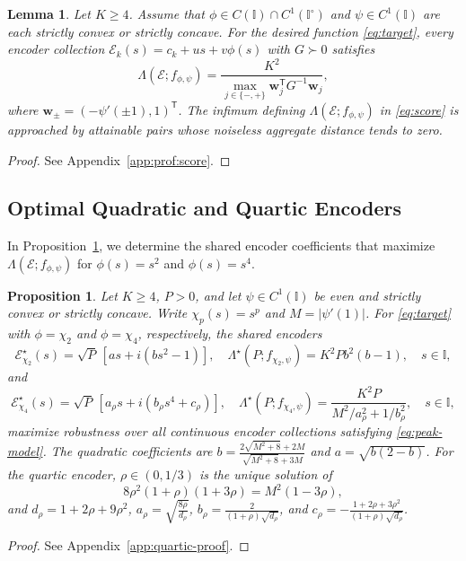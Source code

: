 \documentclass[journal,12pt,onecolumn,draftclsnofoot]{IEEEtran}
\newtheorem{lemma}{Lemma}
\newtheorem{proposition}{Proposition}
\newcommand{\enc}{\mathscr{E}}\newcommand{\dec}{\mathscr{D}}\newcommand{\R}{\mathbb R}\newcommand{\C}{\mathbb C}
\newcommand{\T}{\mathsf T}\newcommand{\suc}{\succeq}
\begin{document}
\begin{lemma}\label{prop:score}
Let $K\ge4$. Assume that
$\phi\in C(\mathbb I)\cap C^1(\mathbb I^\circ)$ and
$\psi\in C^1(\mathbb I)$ are each strictly convex or strictly
concave. For the desired function \eqref{eq:target}, every
encoder collection $\enc_k(s)=c_k+us+v\phi(s)$ with $G\succ0$
satisfies
\begin{equation}
 \Lambda(\enc;f_{\phi,\psi})
 =\frac{K^2}{\max_{j\in\{-,+\}}\boldsymbol w_j^\T G^{-1}\boldsymbol w_j},
 \label{eq:exactscore}
\end{equation}
where $\boldsymbol w_\pm=(-\psi'(\pm1),1)^\T$.
The infimum defining $\Lambda(\enc;f_{\phi,\psi})$ in \eqref{eq:score} is approached by attainable pairs whose
noiseless aggregate distance tends to zero.
\end{lemma}
\begin{proof}
    See Appendix~\ref{app:prof:score}. 
\end{proof}



\subsection{Optimal Quadratic and Quartic Encoders}\label{sec:quadratic-quartic}

In Proposition~\ref{thm:parabola}, we determine the shared encoder
coefficients that maximize $\Lambda(\enc;f_{\phi,\psi})$ for
$\phi(s)=s^2$ and $\phi(s)=s^4$.

\begin{proposition}
\label{thm:parabola}
Let $K\ge4$, $P>0$, and let $\psi\in C^1(\mathbb I)$ be even
and strictly convex or strictly concave. Write $\chi_p(s)=s^p$
and $M=|\psi'(1)|$. For \eqref{eq:target} with
$\phi=\chi_2$ and $\phi=\chi_4$, respectively, the shared encoders
\begin{equation}
 \enc_{\chi_2}^\star(s)=\sqrt P\,[a s+i(bs^2-1)], \quad 
\Lambda^\star(P;f_{\chi_2,\psi})=K^2P b^2(b-1),\quad s\in\mathbb I,
 \label{eq:parabola}
\end{equation}
and
\begin{equation}
 \enc_{\chi_4}^\star(s)=\sqrt P\,[a_\rho s+i(b_\rho s^4+c_\rho)],\quad
\Lambda^\star(P;f_{\chi_4,\psi})=\frac{K^2P}{M^2/a_\rho^2+1/b_\rho^2},\quad s\in\mathbb I,
 \label{eq:quarticscore}
\end{equation}
maximize robustness over all continuous encoder collections
satisfying \eqref{eq:peak-model}. The quadratic coefficients are $b=\frac{2\sqrt{M^2+8}+2M}{\sqrt{M^2+8}+3M}$ and $a=\sqrt{b(2-b)}$. For the quartic encoder, $\rho\in(0,1/3)$ is the unique solution of
\begin{equation}
 8\rho^2(1+\rho)(1+3\rho)=M^2(1-3\rho),
 \label{eq:quarticroot}
\end{equation}
and $d_\rho=1+2\rho+9\rho^2$, $a_\rho=\sqrt{\frac{8\rho}{d_\rho}}$, $b_\rho=\frac{2}{(1+\rho)\sqrt{d_\rho}}$, and $c_\rho=-\frac{1+2\rho+3\rho^2}{(1+\rho)\sqrt{d_\rho}}$.
\end{proposition}
\begin{proof}
See Appendix~\ref{app:quartic-proof}.
\end{proof}
\end{document}
